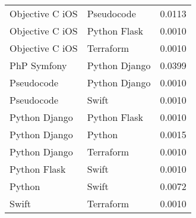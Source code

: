 {\begin{longtable}{lll}
Objective C iOS & Pseudocode & 0.0113\\
Objective C iOS & Python Flask & 0.0010\\
Objective C iOS & Terraform & 0.0010\\
PhP Symfony & Python Django & 0.0399\\
Pseudocode & Python Django & 0.0010\\
Pseudocode & Swift & 0.0010\\
Python Django & Python Flask & 0.0010\\
Python Django & Python & 0.0015\\
Python Django & Terraform & 0.0010\\
Python Flask & Swift & 0.0010\\
Python & Swift & 0.0072\\
Swift & Terraform & 0.0010\\

\end{longtable}

} %
